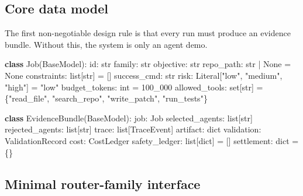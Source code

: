 \documentclass[11pt]{article}
\newenvironment{Shaded}{}{}
\newcommand{\BuiltInTok}[1]{\textcolor[rgb]{0.00,0.50,0.00}{#1}}
\newcommand{\DecValTok}[1]{\textcolor[rgb]{0.25,0.63,0.44}{#1}}
\newcommand{\KeywordTok}[1]{\textcolor[rgb]{0.00,0.44,0.13}{\textbf{#1}}}
\newcommand{\NormalTok}[1]{#1}
\newcommand{\OperatorTok}[1]{\textcolor[rgb]{0.40,0.40,0.40}{#1}}
\newcommand{\StringTok}[1]{\textcolor[rgb]{0.25,0.44,0.63}{#1}}
\newcommand{\VariableTok}[1]{\textcolor[rgb]{0.10,0.09,0.49}{#1}}
\begin{document}
\subsection{Core data model}\label{core-data-model}

The first non-negotiable design rule is that every run must produce an evidence bundle. Without this, the system is only an agent demo.

\begin{Shaded}
\begin{Highlighting}[]
\KeywordTok{class}\NormalTok{ Job(BaseModel):}
    \BuiltInTok{id}\NormalTok{: }\BuiltInTok{str}
\NormalTok{    family: }\BuiltInTok{str}
\NormalTok{    objective: }\BuiltInTok{str}
\NormalTok{    repo\_path: }\BuiltInTok{str} \OperatorTok{|} \VariableTok{None} \OperatorTok{=} \VariableTok{None}
\NormalTok{    constraints: }\BuiltInTok{list}\NormalTok{[}\BuiltInTok{str}\NormalTok{] }\OperatorTok{=}\NormalTok{ []}
\NormalTok{    success\_cmd: }\BuiltInTok{str}
\NormalTok{    risk: Literal[}\StringTok{"low"}\NormalTok{, }\StringTok{"medium"}\NormalTok{, }\StringTok{"high"}\NormalTok{] }\OperatorTok{=} \StringTok{"low"}
\NormalTok{    budget\_tokens: }\BuiltInTok{int} \OperatorTok{=} \DecValTok{100\_000}
\NormalTok{    allowed\_tools: }\BuiltInTok{set}\NormalTok{[}\BuiltInTok{str}\NormalTok{] }\OperatorTok{=}\NormalTok{ \{}\StringTok{"read\_file"}\NormalTok{, }\StringTok{"search\_repo"}\NormalTok{, }\StringTok{"write\_patch"}\NormalTok{, }\StringTok{"run\_tests"}\NormalTok{\}}

\KeywordTok{class}\NormalTok{ EvidenceBundle(BaseModel):}
\NormalTok{    job: Job}
\NormalTok{    selected\_agents: }\BuiltInTok{list}\NormalTok{[}\BuiltInTok{str}\NormalTok{]}
\NormalTok{    rejected\_agents: }\BuiltInTok{list}\NormalTok{[}\BuiltInTok{str}\NormalTok{]}
\NormalTok{    trace: }\BuiltInTok{list}\NormalTok{[TraceEvent]}
\NormalTok{    artifact: }\BuiltInTok{dict}
\NormalTok{    validation: ValidationRecord}
\NormalTok{    cost: CostLedger}
\NormalTok{    safety\_ledger: }\BuiltInTok{list}\NormalTok{[}\BuiltInTok{dict}\NormalTok{] }\OperatorTok{=}\NormalTok{ []}
\NormalTok{    settlement: }\BuiltInTok{dict} \OperatorTok{=}\NormalTok{ \{\}}
\end{Highlighting}
\end{Shaded}

\subsection{Minimal router-family interface}\label{minimal-router-family-interface}
\end{document}

